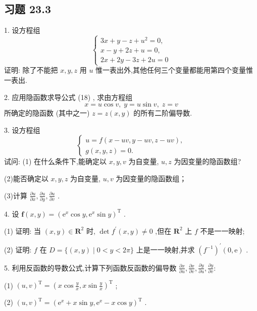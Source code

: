 \subsection{习题 23.3}

1. 设方程组
\[
\left\{  \begin{array}{l} {3x} + y - z + {u}^{2} = 0, \\  x - y + {2z} + u = 0, \\  {2x} + {2y} - {3z} + {2u} = 0 \end{array}\right.
\]
证明: 除了不能把 \(x,y,z\) 用 \(u\) 惟一表出外,其他任何三个变量都能用第四个变量惟一表出.

2. 应用隐函数求导公式 (18) , 求由方程组
\[
x = u\cos v,\;y = u\sin v,\;z = v
\]
所确定的隐函数 (其中之一) \(z = z\left( {x,y}\right)\) 的所有二阶偏导数.

3. 设方程组
\[
\left\{  \begin{array}{l} u = f\left( {x - {uv},y - {uv},z - {uv}}\right) , \\  g\left( {x,y,z}\right)  = 0. \end{array}\right.
\]
试问: (1) 在什么条件下,能确定以 \(x,y,v\) 为自变量, \(u,z\) 为因变量的隐函数组?

(2)能否确定以 \(x,y,z\) 为自变量, \(u,v\) 为因变量的隐函数组；

(3)计算 \(\frac{\partial u}{\partial x},\frac{\partial u}{\partial y},\frac{\partial u}{\partial v}\) .

4. 设 \(\mathbf{f}\left( {x,y}\right)  = {\left( {\mathrm{e}}^{x}\cos y,{\mathrm{e}}^{x}\sin y\right) }^{\mathrm{T}}\) .

(1) 证明: 当 \(\left( {x,y}\right)  \in  {\mathbf{R}}^{2}\) 时, \(\det {f}^{\prime }\left( {x,y}\right)  \neq  0\) ,但在 \({\mathbf{R}}^{2}\) 上 \(f\) 不是一一映射;

(2) 证明: \(f\) 在 \(D = \{ \left( {x,y}\right)  \mid  0 < y < {2\pi }\}\) 上是一一映射,并求 \({\left( {f}^{-1}\right) }^{\prime }\left( {0,\mathrm{e}}\right)\) .

5. 利用反函数的导数公式,计算下列函数反函数的偏导数 \(\frac{\partial x}{\partial u},\frac{\partial x}{\partial v},\frac{\partial y}{\partial u},\frac{\partial y}{\partial v} :\)

(1) \({\left( u,v\right) }^{\mathrm{T}} = {\left( x\cos \frac{y}{x},x\sin \frac{y}{x}\right) }^{\mathrm{T}}\) ;

(2) \({\left( u,v\right) }^{\mathrm{T}} = {\left( {\mathrm{e}}^{x} + x\sin y,{\mathrm{e}}^{x} - x\cos y\right) }^{\mathrm{T}}\) .

